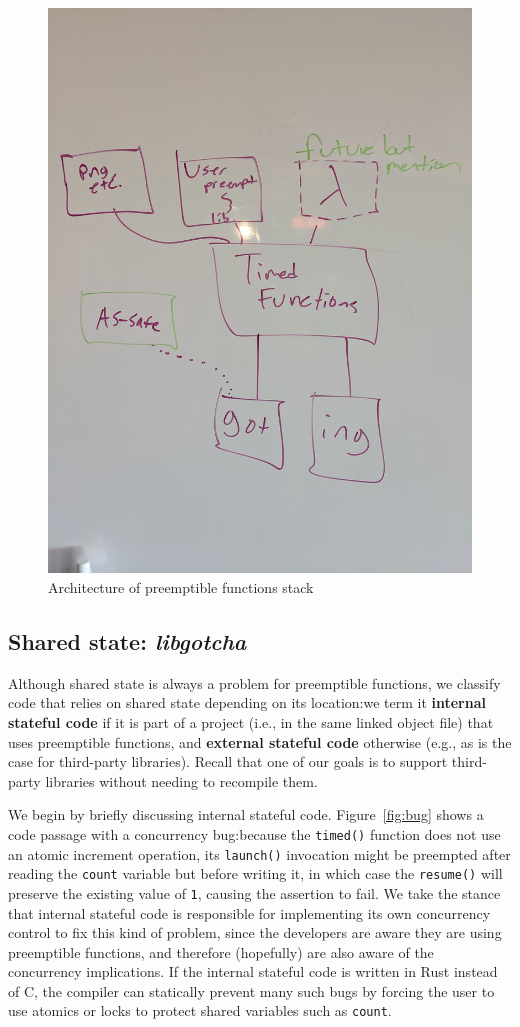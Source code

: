 \begin{figure}
\includegraphics[height=\columnwidth,angle=270]{figs/architecture}
\caption{Architecture of preemptible functions stack}
\label{fig:architecture}
\end{figure}

\subsection{Shared state: \textit{libgotcha}}
\label{sec:libgotcha}

Although shared state is always a problem for preemptible functions, we classify code
that relies on shared state depending on its location:\@ we term it \textbf{internal
stateful code} if it is part of a project (i.e., in the same linked object file)
that uses preemptible functions, and \textbf{external stateful code} otherwise (e.g.,
as is the case for third-party libraries).  Recall that one of our goals is to
support third-party libraries without needing to recompile them.

We begin by briefly discussing internal stateful code.  Figure~\ref{fig:bug} shows
a code passage with a concurrency bug:\@ because the \texttt{timed()} function does
not use an atomic increment operation, its \texttt{launch()} invocation might be
preempted after reading the \texttt{count} variable but before writing it, in which
case the \texttt{resume()} will preserve the existing value of \texttt{1}, causing
the assertion to fail.  We take the stance that internal stateful code is responsible
for implementing its own concurrency control to fix this kind of problem, since the
developers are aware they are using preemptible functions, and therefore (hopefully)
are also aware of the concurrency implications.  If the internal stateful code is
written in Rust instead of C, the compiler can statically prevent many such bugs by
forcing the user to use atomics or locks to protect shared variables such as
\texttt{count}.

